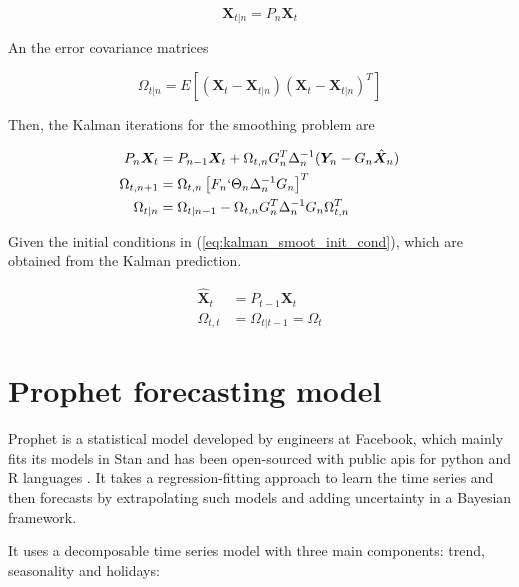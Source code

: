 \begin{equation}
	\bm{X}_{t|n} = P_n \bm{X}_t
\end{equation}

An the error covariance matrices \cite{brockwell2016introduction}

\begin{equation}
	\Omega_{t|n} = E \left[(\bm{X}_{t} - \bm{X}_{t|n})(\bm{X}_{t} - \bm{X}_{t|n})^T \right]
\end{equation}

Then, the Kalman iterations for the smoothing problem are \cite{brockwell2016introduction}

\begin{align}
	P_n \bm{X}_t	
	&= 
	P_{n-1} \bm{X}_t + \Omega_{t,n} G_n^T \Delta_n^{-1} (\bm{Y}_n - G_n \hat{\bm{X}}_n) 
	\\
	\Omega_{t,n+1} 		
	&=
	\Omega_{t,n} \left[ F_n `\Theta_n \Delta_n^{-1} G_n \right]^T
	\\
	\Omega_{t|n}
	&=
	\Omega_{t|n-1} - \Omega_{t,n} G_n^T \Delta_n^{-1} G_n \Omega_{t,n}^T
\end{align}

Given the initial conditions in (\ref{eq:kalman_smoot_init_cond}), which are obtained from the Kalman prediction.

\begin{align}
	\label{eq:kalman_smoot_init_cond}
	\hat{\bm{X}}_t &= P_{t-1} \bm{X}_t \\
	\Omega_{t,t} &= \Omega_{t|t-1} = \Omega_t
\end{align}











\section{Prophet forecasting model}
\label{cha:forecasting}

Prophet is a statistical model developed by engineers at Facebook, which mainly fits its models in Stan \cite{carpenter2017stan} and has been open-sourced with public \acp{api} for python and R languages \cite{fb_prophet}. It takes a regression-fitting approach to learn the time series and then forecasts by extrapolating such models and adding uncertainty in a Bayesian framework.

It uses a decomposable time series model \cite{harvey1990estimation} with three main components: trend, seasonality and holidays:

